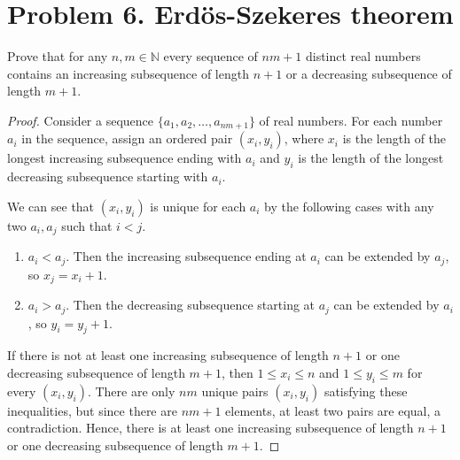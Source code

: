 \documentclass{article}
\begin{document}
\section{Problem 6. Erdös-Szekeres theorem}
Prove that for any $n, m \in \mathbb{N}$ every sequence of $nm+1$ distinct real numbers contains an increasing subsequence of length $n+1$ or a decreasing subsequence of length $m+1$.
\begin{proof}
Consider a sequence $\{a_1, a_2,\dots,a_{nm+1}\}$ of real numbers. For each number $a_i$ in the sequence, assign an ordered pair $(x_i,y_i)$, where $x_i$ is the length of the longest increasing subsequence ending with $a_i$ and $y_i$ is the length of the longest decreasing subsequence starting with $a_i$. 

\par We can see that $(x_i,y_i)$ is unique for each $a_i$ by the following cases with any two $a_i, a_j$ such that $i<j$.
\begin{enumerate}[label=(\arabic*)]
    \item $a_i<a_j$. Then the increasing subsequence ending at $a_i$ can be extended by $a_j$, so $x_j=x_i+1$.
    \item $a_i>a_j$. Then the decreasing subsequence starting at $a_j$ can be extended by $a_i$, so $y_i=y_j+1$.
\end{enumerate}
\par If there is not at least one increasing subsequence of length $n+1$ or one decreasing subsequence of length $m+1$, then $1\leq x_i\leq n$ and $1\leq y_i\leq m$ for every $(x_i,y_i)$. There are only $nm$ unique pairs $(x_i,y_i)$ satisfying these inequalities, but since there are $nm+1$ elements, at least two pairs are equal, a contradiction. Hence, there is at least one increasing subsequence of length $n+1$ or one decreasing subsequence of length $m+1$.
\end{proof}
\end{document}
